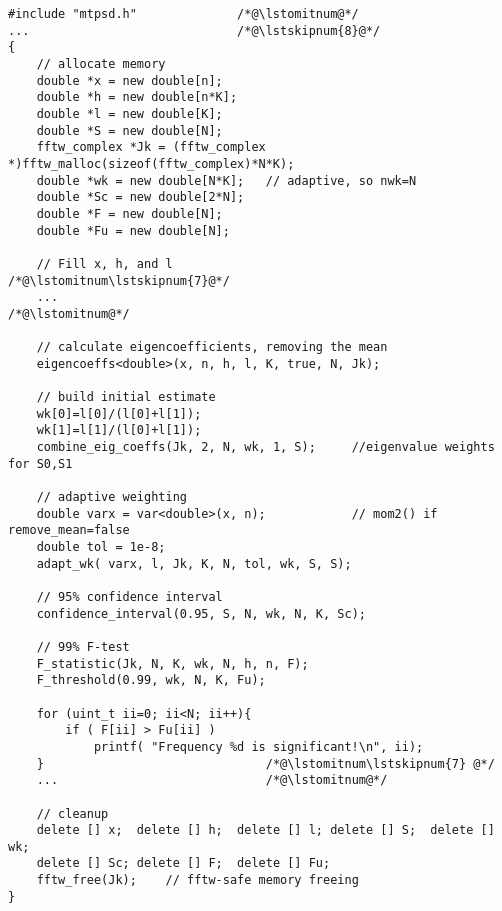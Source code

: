 \begin{lstlisting}[label=lst:mtpsdadvanced,caption=An \texttt{mtpsd} advanced example ]
#include "mtpsd.h"              /*@\lstomitnum@*/
...                             /*@\lstskipnum{8}@*/
{
    // allocate memory
    double *x = new double[n];
    double *h = new double[n*K];
    double *l = new double[K]; 
    double *S = new double[N];
    fftw_complex *Jk = (fftw_complex *)fftw_malloc(sizeof(fftw_complex)*N*K);
    double *wk = new double[N*K];   // adaptive, so nwk=N
    double *Sc = new double[2*N];
    double *F = new double[N];
    double *Fu = new double[N];
    
    // Fill x, h, and l                                         /*@\lstomitnum\lstskipnum{7}@*/
    ...                                                         /*@\lstomitnum@*/

    // calculate eigencoefficients, removing the mean
    eigencoeffs<double>(x, n, h, l, K, true, N, Jk);
    
    // build initial estimate
    wk[0]=l[0]/(l[0]+l[1]);
    wk[1]=l[1]/(l[0]+l[1]);
    combine_eig_coeffs(Jk, 2, N, wk, 1, S);     //eigenvalue weights for S0,S1

    // adaptive weighting
    double varx = var<double>(x, n);            // mom2() if remove_mean=false
    double tol = 1e-8;
    adapt_wk( varx, l, Jk, K, N, tol, wk, S, S);  

    // 95% confidence interval
    confidence_interval(0.95, S, N, wk, N, K, Sc);

    // 99% F-test
    F_statistic(Jk, N, K, wk, N, h, n, F);          
    F_threshold(0.99, wk, N, K, Fu);     

    for (uint_t ii=0; ii<N; ii++){
        if ( F[ii] > Fu[ii] )
            printf( "Frequency %d is significant!\n", ii);
    }                               /*@\lstomitnum\lstskipnum{7} @*/
    ...                             /*@\lstomitnum@*/

    // cleanup
    delete [] x;  delete [] h;  delete [] l; delete [] S;  delete [] wk; 
    delete [] Sc; delete [] F;  delete [] Fu;
    fftw_free(Jk);    // fftw-safe memory freeing
}
\end{lstlisting} 
